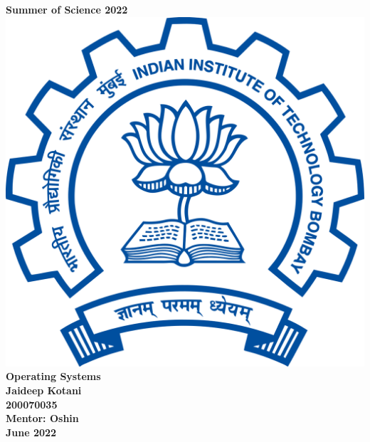 \documentclass{article}
\begin{document}


\begin{titlepage}
\begin{center}
\Huge\textbf{Summer of Science 2022}\\
\vspace{2cm}
\includegraphics[scale=0.18]{img/iitb_logo.png}\\
\vspace{2cm}
\huge\textbf{Operating Systems}\\
\vspace{1.5cm}
\LARGE\textbf{Jaideep Kotani}\\
\LARGE\textbf{200070035}\\
\LARGE\textbf{Mentor: Oshin}\\
\vspace{1.5cm}
\Large{\textbf{June 2022}}
\end{center}
\end{titlepage}


\tableofcontents
\newpage
\end{document}
